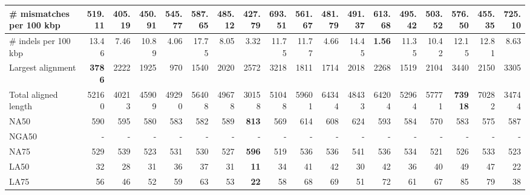 \documentclass[12pt,a4paper]{article}
\begin{document}
\begin{table}[ht]
\begin{center}
\begin{tabular}{|l*{17}{|r}|}
\# mismatches per 100 kbp & 519.11 & {\bf 405.19} & 450.91 & 545.77 & 587.65 & 485.12 & 427.79 & 693.51 & 561.67 & 481.79 & 491.37 & 613.68 & 495.42 & 503.52 & 576.50 & 455.35 & 725.10 \\ \hline
\# indels per 100 kbp & 13.46 & 7.46 & 10.89 & 4.06 & 17.75 & 8.05 & 3.32 & 11.75 & 11.77 & 4.66 & 14.45 & {\bf 1.56} & 11.35 & 10.42 & 12.15 & 12.81 & 8.63 \\ \hline
Largest alignment & {\bf 3786} & 2222 & 1925 & 970 & 1540 & 2020 & 2572 & 3218 & 1811 & 1714 & 2018 & 2268 & 1519 & 2104 & 3440 & 2150 & 3305 \\ \hline
Total aligned length & 52160 & 40213 & 45909 & 49290 & 56408 & 49678 & 30158 & 51048 & 59601 & 64344 & 48433 & 64204 & 52964 & 57771 & {\bf 73918} & 70282 & 34744 \\ \hline
NA50 & 590 & 595 & 580 & 583 & 582 & 589 & {\bf 813} & 569 & 614 & 608 & 624 & 593 & 584 & 570 & 583 & 575 & 587 \\ \hline
NGA50 & - & - & - & - & - & - & - & - & - & - & - & - & - & - & - & - & - \\ \hline
NA75 & 529 & 539 & 523 & 531 & 530 & 527 & {\bf 596} & 519 & 536 & 536 & 541 & 536 & 534 & 521 & 526 & 533 & 523 \\ \hline
LA50 & 32 & 28 & 31 & 36 & 37 & 31 & {\bf 11} & 34 & 41 & 42 & 30 & 42 & 36 & 40 & 49 & 47 & 22 \\ \hline
LA75 & 56 & 46 & 52 & 59 & 63 & 53 & {\bf 22} & 58 & 68 & 69 & 51 & 72 & 61 & 67 & 85 & 79 & 38 \\ \hline
\end{tabular}
\end{center}
\end{table}
\end{document}
